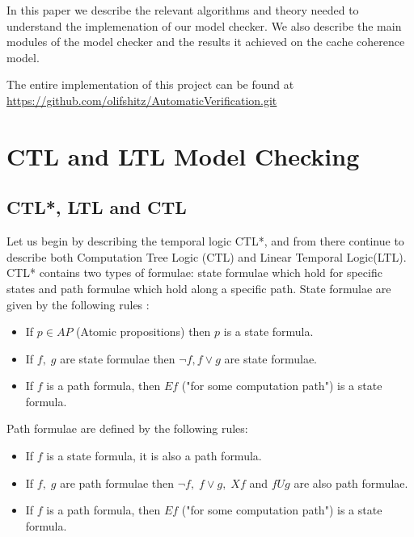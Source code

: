 \documentclass[11pt]{article}
\begin{document}
   In this paper we describe the relevant algorithms and theory needed to
   understand the implemenation of our model checker. We also describe the 
   main modules of the model checker and the results it achieved on the 
   cache coherence model.

   The entire implementation of this project can be found at \url{https://github.com/olifshitz/AutomaticVerification.git}

\section{CTL and LTL Model Checking}

   \subsection{CTL*, LTL and CTL}
        Let us begin by describing the temporal logic CTL*, and from there continue
        to describe both Computation Tree Logic (CTL) and Linear Temporal Logic(LTL).
        CTL* contains two types of formulae: state formulae which hold for specific
        states and path formulae which hold along a specific path. State formulae
        are given by the following rules \cite{ltl}:
        \begin{itemize}
            \item
                If $p \in AP$ (Atomic propositions) then $p$ is a state formula.

            \item
                If $f,\; g$ are state formulae then $\neg f, f \vee g$ are state formulae.

            \item
                If $f$ is a path formula, then $Ef$ ("for some computation path")
                is a state formula.
        \end{itemize}

        Path formulae are defined by the following rules:
        \begin{itemize}
            \item
                If $f$ is a state formula, it is also a path formula.

            \item
                If $f,\; g$ are path formulae then $\neg f,\; f \vee g, \; Xf$ and 
                $fUg$ are also path formulae.

            \item
                If $f$ is a path formula, then $Ef$ ("for some computation path")
                is a state formula.
        \end{itemize}
        
\end{document}
